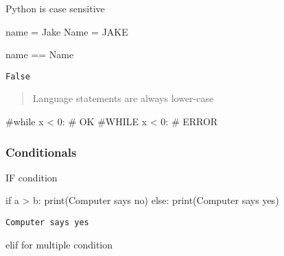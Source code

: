 \documentclass[
  letterpaper,
  DIV=11,
  numbers=noendperiod]{scrreprt}
\newenvironment{Shaded}{\begin{snugshade}}{\end{snugshade}}
\newcommand{\BuiltInTok}[1]{\textcolor[rgb]{0.00,0.46,0.62}{#1}}
\newcommand{\BuiltInTok}[1]{\textcolor[rgb]{0.00,0.48,0.65}{#1}}
\newcommand{\CommentTok}[1]{\textcolor[rgb]{0.37,0.37,0.37}{#1}}
\newcommand{\ControlFlowTok}[1]{\textcolor[rgb]{0.00,0.46,0.62}{#1}}
\newcommand{\ControlFlowTok}[1]{\textcolor[rgb]{0.00,0.48,0.65}{#1}}
\newcommand{\NormalTok}[1]{\textcolor[rgb]{0.00,0.46,0.62}{#1}}
\newcommand{\OperatorTok}[1]{\textcolor[rgb]{0.37,0.37,0.37}{#1}}
\newcommand{\NormalTok}[1]{\textcolor[rgb]{0.00,0.48,0.65}{#1}}
\newcommand{\OperatorTok}[1]{\textcolor[rgb]{0.37,0.37,0.37}{#1}}
\newcommand{\StringTok}[1]{\textcolor[rgb]{0.13,0.47,0.30}{#1}}
\begin{document}
Python is case sensitive

\begin{Shaded}
\begin{Highlighting}[]
\NormalTok{name }\OperatorTok{=} \StringTok{\textquotesingle{}Jake\textquotesingle{}}
\NormalTok{Name }\OperatorTok{=} \StringTok{\textquotesingle{}JAKE\textquotesingle{}}

\NormalTok{name }\OperatorTok{==}\NormalTok{ Name}
\end{Highlighting}
\end{Shaded}

\begin{verbatim}
False
\end{verbatim}

\begin{quote}
Language statements are always lower-case
\end{quote}

\begin{Shaded}
\begin{Highlighting}[]
\CommentTok{\#while x \textless{} 0:   \# OK}
\CommentTok{\#WHILE x \textless{} 0:   \# ERROR}
\end{Highlighting}
\end{Shaded}

\hypertarget{conditionals}{%
\subsubsection{Conditionals}\label{conditionals}}

IF condition

\begin{Shaded}
\begin{Highlighting}[]
\ControlFlowTok{if}\NormalTok{ a }\OperatorTok{\textgreater{}}\NormalTok{ b:}
    \BuiltInTok{print}\NormalTok{(}\StringTok{\textquotesingle{}Computer says no\textquotesingle{}}\NormalTok{)}
\ControlFlowTok{else}\NormalTok{:}
    \BuiltInTok{print}\NormalTok{(}\StringTok{\textquotesingle{}Computer says yes\textquotesingle{}}\NormalTok{)}
\end{Highlighting}
\end{Shaded}

\begin{verbatim}
Computer says yes
\end{verbatim}

elif for multiple condition
\end{document}

